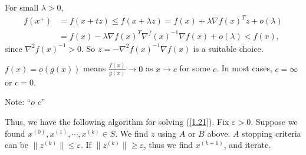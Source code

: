 For small $\lambda>0$,
\begin{align*}
    f(x^+) & = f(x+tz) \le f(x+\lambda z) = f(x) + \lambda\nabla f(x)^Tz + o(\lambda) \\
    &= f(x) - \lambda \nabla f(x)^T \nabla^ f(x)^{-1}\nabla f(x) + o(\lambda) < f(x),
\end{align*}
since $\nabla^2 f(x)^{-1}>0$. So $z = -\nabla^2 f(x)^{-1} \nabla f(x)$ is a suitable choice.

$f(x) = o(g(x))$ means $\frac{f(x)}{g(x)}\to 0$ as $x\to c$ for some $c$. In most cases, $c= \infty$ or $c = 0$. 

Note: ``$o$  $c$''

Thus, we have the following algorithm for solving (\ref{1.21}). Fix $\varepsilon>0$. Suppose we found $x^{(0)}, x^{(1)}, \cdots, x^{(k)}\in S$. We find $z$ using $A$ or $B$ above. $A$ stopping criteria can be $\|z^{(k)}\|\leqslant \varepsilon$. If $\|z^{(k)}\|\geqslant \varepsilon$, thus we find $x^{(k+1)}$, and iterate.

